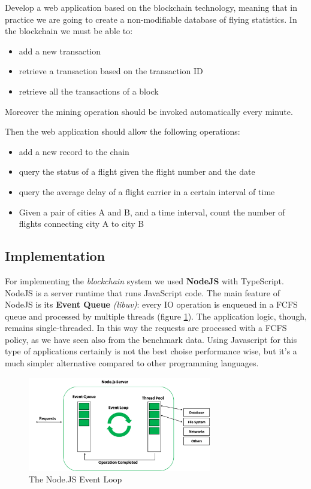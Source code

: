 \documentclass[11pt]{scrartcl} %
\begin{document}
Develop a web application based on the blockchain technology, meaning that in practice we are going to create a non-modifiable database of flying statistics. In the blockchain we must be able to:
\begin{itemize}
\item[\adforn{43}] add a new transaction
\item[\adforn{43}] retrieve a transaction based on the transaction ID
\item[\adforn{43}] retrieve all the transactions of a block
\end{itemize}

Moreover the mining operation should be invoked automatically every minute. 

Then the web application should allow the following operations:
\begin{itemize}
\item[\adforn{43}] add a new record to the chain
\item[\adforn{43}] query the status of a flight given the flight number and the date
\item[\adforn{43}] query the average delay of a flight carrier in a certain interval of time
\item[\adforn{43}] Given a pair of cities A and B, and a time interval, count the number of flights connecting city A to city B
\end{itemize}

\subsection{Implementation}

For implementing the \textit{blockchain} system we used \textbf{NodeJS} with TypeScript. NodeJS is a server runtime that runs JavaScript code. The main feature of NodeJS is its \textbf{Event Queue} \textit{(libuv)}: every IO operation is enqueued in a FCFS queue and processed by multiple threads (figure \ref{fig:eventloop}). The application logic, though, remains single-threaded. In this way the requests are processed with a FCFS policy, as we have seen also from the benchmark data. Using Javascript for this type of applications certainly is not the best choise performance wise, but it's a much simpler alternative compared to other programming languages.

\begin{figure}[h]
\includegraphics[width=8cm]{Images/eventloop.png}
\centering
\caption{The Node.JS Event Loop}
\label{fig:eventloop}
\end{figure}
\end{document}
